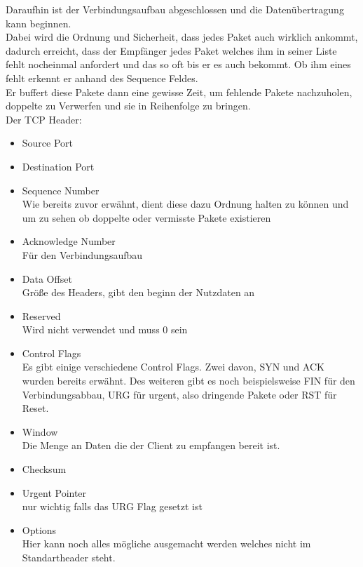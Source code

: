 \documentclass[11pt,a4paper]{report}
\begin{document}
Daraufhin ist der Verbindungsaufbau abgeschlossen und die Datenübertragung kann beginnen.\\
Dabei wird die Ordnung und Sicherheit, dass jedes Paket auch wirklich ankommt, dadurch erreicht, dass der Empfänger jedes Paket welches ihm in seiner Liste fehlt nocheinmal anfordert und das so oft bis er es auch bekommt. Ob ihm eines fehlt erkennt er anhand des Sequence Feldes.\\
Er buffert diese Pakete dann eine gewisse Zeit, um fehlende Pakete nachzuholen, doppelte zu Verwerfen und sie in Reihenfolge zu bringen.\\

Der TCP Header:\\
\begin{itemize}
\item Source Port
\item Destination Port
\item Sequence Number\\
Wie bereits zuvor erwähnt, dient diese dazu Ordnung halten zu können und um zu sehen ob doppelte oder vermisste Pakete existieren
\item Acknowledge Number\\
Für den Verbindungsaufbau
\item Data Offset\\
Größe des Headers, gibt den beginn der Nutzdaten an
\item Reserved\\
Wird nicht verwendet und muss 0 sein
\item Control Flags\\
Es gibt einige verschiedene Control Flags. Zwei davon, SYN und ACK wurden bereits erwähnt. Des weiteren gibt es noch beispielsweise FIN für den Verbindungsabbau, URG für urgent, also dringende Pakete oder RST für Reset.
\item Window \\
Die Menge an Daten die der Client zu empfangen bereit ist.
\item Checksum
\item Urgent Pointer\\
nur wichtig falls das URG Flag gesetzt ist
\item Options\\
Hier kann noch alles mögliche ausgemacht werden welches nicht im Standartheader steht.
\end{itemize}
\end{document}
